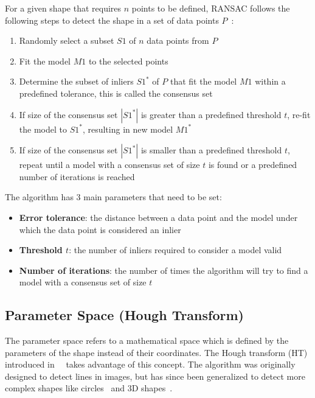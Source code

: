 For a given shape that requires $n$ points to be defined, RANSAC follows the following steps to detect the shape
in a set of data points $P$~\parencite{fischler_random_1981}:
\begin{enumerate}
    \item Randomly select a subset $S1$ of $n$ data points from $P$
    \item Fit the model $M1$ to the selected points
    \item Determine the subset of inliers $S1^*$ of $P$ that fit the model $M1$ within a predefined tolerance, this is called the consensus set
    \item If size of the consensus set $|S1^*|$ is greater than a predefined threshold $t$, re-fit the model to $S1^*$, resulting in new model $M1^*$
    \item If size of the consensus set $|S1^*|$ is smaller than a predefined threshold $t$, repeat until a model with a consensus set of size $t$ is found or a predefined number of iterations is reached
\end{enumerate}

The algorithm has 3 main parameters that need to be set:
\begin{itemize}
    \item \textbf{Error tolerance}: the distance between a data point and the model under which the data point is considered an inlier
    \item \textbf{Threshold $t$}: the number of inliers required to consider a model valid
    \item \textbf{Number of iterations}: the number of times the algorithm will try to find a model with a consensus set of size $t$
\end{itemize}

\subsection{Parameter Space (Hough Transform)}
The parameter space refers to a mathematical space which is defined by the parameters of the shape instead of their coordinates.
The Hough transform (HT) introduced in~\citeyear{hough_method_1962}~\parencite{hough_method_1962} takes advantage of this concept.
The algorithm was originally designed to detect lines in images,
but has since been generalized to detect more complex shapes like circles~\cite{ballard_generalizing_1981} and 3D shapes~\cite{woodford_demisting_2014}.

